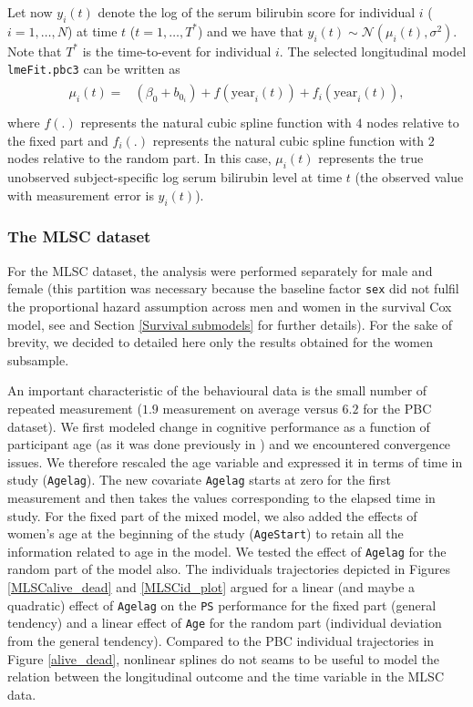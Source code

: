 \documentclass[12pt]{article}
\begin{document}
Let now $y_{i}(t)$ denote the log of the serum bilirubin score for individual $i$ ($i=1, \dots, N$) at time $t$ ($t=1, \dots, T^{*}$) and we have that $y_{i}(t) \sim \mathcal{N}(\mu_i(t), \sigma^{2}) $. Note that $T^{*}$ is the time-to-event for individual $i$. The selected longitudinal model \texttt{lmeFit.pbc3} can be written as
\begin{equation}
\begin{split}
\begin{aligned}
\mu_i(t) = &(\beta_0 +b_{0_{i}} )+ f(\text{year}_i(t))+f_i(\text{year}_i(t)),\\ 
\end{aligned}
\end{split}
\label{Longitudinal model_pbc}
\end{equation}
where $f(.)$ represents the natural cubic spline function with $4$ nodes relative to the fixed part and $f_i(.)$ represents the natural cubic spline function with $2$ nodes relative to the random part. In this case, $\mu_i(t)$ represents the true unobserved subject-specific log serum bilirubin level at time $t$ (the observed value with measurement error is $y_{i}(t)$).


\subsubsection{The MLSC dataset}

For the MLSC dataset, the analysis were performed separately for male and female (this partition was necessary because the baseline factor \texttt{sex} did not fulfil the proportional hazard assumption across men and women in the survival Cox model, see \cite{aichele2015life} and Section \ref{Survival submodels} for further details). For the sake of brevity, we decided  to detailed here only the results obtained for the women subsample.

An important characteristic of the behavioural data is the small number of repeated measurement ($1.9$ measurement on average versus $6.2$ for the PBC dataset). We first modeled change in cognitive performance as a function of participant age (as it was done previously in \cite{aichele2015life}) and we encountered convergence issues. We therefore rescaled the age variable and expressed it in terms of time in study (\texttt{Agelag}). The new covariate \texttt{Agelag} starts at zero for the first measurement and then takes the values corresponding to the elapsed time in study. For the fixed part of the mixed model, we also added the effects of women's age at the beginning of the study (\texttt{AgeStart}) to retain all the information related to age in the model. We tested the effect of \texttt{Agelag} for the random part of the model also.
The individuals trajectories depicted in Figures \ref{MLSCalive_dead} and \ref{MLSCid_plot} argued for a linear (and maybe a quadratic) effect of \texttt{Agelag} on the \texttt{PS} performance for the fixed part (general tendency) and  a linear effect of \texttt{Age} for the random part (individual deviation from the general tendency). Compared to the PBC individual trajectories in Figure \ref{alive_dead}, nonlinear splines do not seams to be useful to model the relation between the longitudinal outcome and the time variable in the MLSC data. 
\end{document}
